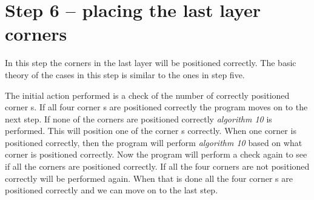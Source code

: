 \section{Step 6 -- placing the last layer corners}
In this step the corners in the last layer will be positioned correctly. 
The basic theory of the cases in this step is similar to the ones in step five.

The initial action performed is a check of the number of correctly positioned corner \cpiece{}s. 
If all four corner \cpiece{}s are positioned correctly the program moves on to the next step.
If none of the corners are positioned correctly \textit{algorithm 10} is performed. This will position one of the corner \cpiece{}s correctly.
When one corner is positioned correctly, then the program will perform \textit{algorithm 10} based on what corner is positioned correctly.
Now the program will perform a check again to see if all the corners are positioned correctly. If all the four corners are not positioned correctly  will be performed again.
When that is done all the four corner \cpiece{}s are positioned correctly and we can move on to the last step.
